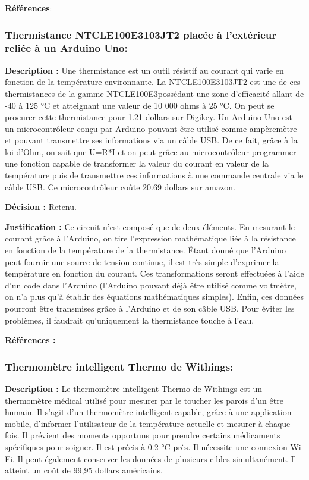 \textbf{Références}: \cite{Ares} \cite{AmAc} \cite{CaAc}

\subsubsection{Thermistance NTCLE100E3103JT2 placée à l’extérieur reliée à un Arduino Uno:}
\label{thermis}

\textbf{Description :} Une thermistance est un outil résistif au courant qui varie en fonction de la température environnante. La NTCLE100E3103JT2 est une de ces thermistances de la gamme NTCLE100E3possédant une zone d’efficacité allant de -40 à 125 °C et atteignant une valeur de 10 000 ohms à 25 °C. On peut se procurer cette thermistance pour 1.21 dollars sur Digikey. Un Arduino Uno est un microcontrôleur conçu par Arduino pouvant être utilisé comme ampèremètre et pouvant transmettre ses informations via un câble USB. De ce fait, grâce à la loi d’Ohm, on sait que U=R*I et on peut grâce au microcontrôleur programmer une fonction capable de transformer la valeur du courant en valeur de la température puis de transmettre ces informations à une commande centrale via le câble USB. Ce microcontrôleur coûte 20.69 dollars sur amazon. 

\textbf{Décision :} Retenu.

\textbf{Justification :} Ce circuit n’est composé que de deux éléments. En mesurant le courant grâce à l’Arduino, on tire l’expression mathématique liée à la résistance en fonction de la température de la thermistance. Étant donné que l’Arduino peut fournir une source de tension continue, il est très simple d’exprimer la température en fonction du courant. Ces transformations seront effectuées à l’aide d’un code dans l’Arduino (l’Arduino pouvant déjà être utilisé comme voltmètre, on n’a plus qu’à établir des équations mathématiques simples). Enfin, ces données pourront être transmises grâce à l’Arduino et de son câble USB. Pour éviter les problèmes, il faudrait qu'uniquement la thermistance touche à l'eau.

\textbf{Références :} \cite{TuAr} \cite{DaTh} \cite{AmAr}

\subsubsection{Thermomètre intelligent Thermo de Withings:}

\textbf{Description :} Le thermomètre intelligent Thermo de Withings est un thermomètre médical utilisé pour mesurer par le toucher les parois d’un être humain. Il s’agit d’un thermomètre intelligent capable, grâce à une application mobile, d’informer l’utilisateur de la température actuelle et mesurer à chaque fois. Il prévient des moments opportuns pour prendre certains médicaments spécifiques pour soigner. Il est précis à 0.2 °C près. Il nécessite une connexion Wi-Fi. Il peut également conserver les données de plusieurs cibles simultanément. Il atteint un coût de 99,95 dollars américains.

